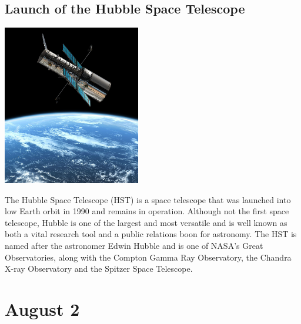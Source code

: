 \documentclass[11pt]{report}
\begin{document}
\subsection{Launch of the Hubble Space Telescope}
\vspace{2mm}\begin{center}\includegraphics[width=6cm]{./img/hubble.jpg}\end{center}
The Hubble Space Telescope (HST) is a space telescope that was launched into low Earth orbit in 1990 and remains in operation. Although not the first space telescope, Hubble is one of the largest and most versatile and is well known as both a vital research tool and a public relations boon for astronomy. The HST is named after the astronomer Edwin Hubble and is one of NASA's Great Observatories, along with the Compton Gamma Ray Observatory, the Chandra X-ray Observatory and the Spitzer Space Telescope.

\section{August 2}
\end{document}
